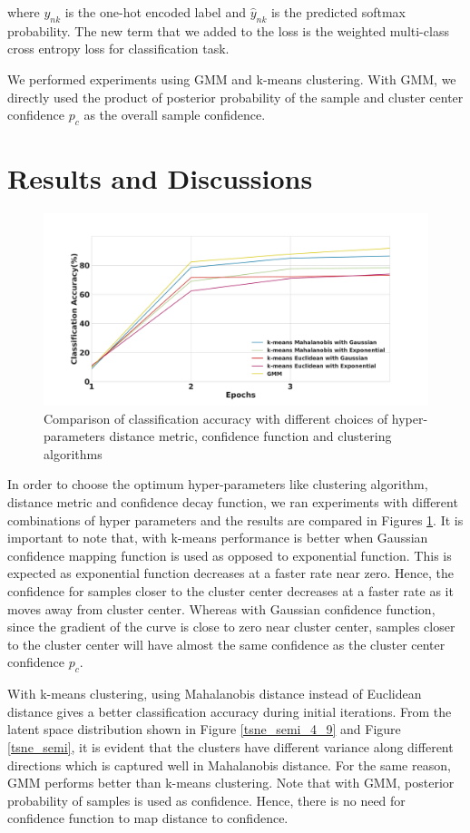 \documentclass[runningheads]{llncs}
\begin{document}
where $y_{nk}$ is the one-hot encoded label and $\hat{y}_{nk}$ is the predicted softmax probability.
The new term that we added to the loss is the weighted multi-class cross entropy loss for classification task.


We performed experiments using GMM and k-means clustering.
With GMM, we directly used the product of posterior probability of the sample and cluster center confidence $p_c$ as the overall sample confidence.


\section{Results and Discussions}

\begin{figure}[!t]
\centering
  \centering
  \includegraphics[width=.7\linewidth]{classification_accuracy_hyperparameter}
\caption{Comparison of classification accuracy with different choices of hyper-parameters distance metric, confidence function and clustering algorithms}
\label{classification_acc}
\end{figure}

In order to choose the optimum hyper-parameters like clustering algorithm, distance metric and confidence decay function, we ran experiments with different combinations of hyper parameters and the results are compared in Figures \ref{classification_acc}.
It is important to note that, with k-means performance is better when Gaussian confidence mapping function is used as opposed to exponential function.
This is expected as exponential function decreases at a faster rate near zero.
Hence, the confidence for samples closer to the cluster center decreases at a faster rate as it moves away from cluster center.
Whereas  with Gaussian confidence function, since the gradient of the curve is close to zero near cluster center, samples closer to the cluster center will have almost the same confidence as the cluster center confidence $p_c$.


With k-means clustering, using Mahalanobis distance instead of Euclidean distance gives a better classification accuracy during initial iterations.
From the latent space distribution shown in Figure \ref{tsne_semi_4_9} and Figure \ref{tsne_semi}, it is evident that the clusters have different variance along different directions which is captured well in Mahalanobis distance.
For the same reason, GMM performs better than k-means clustering.
Note that with GMM, posterior probability of samples is used as confidence.
Hence, there is no need for confidence function to map distance to confidence.
\end{document}
